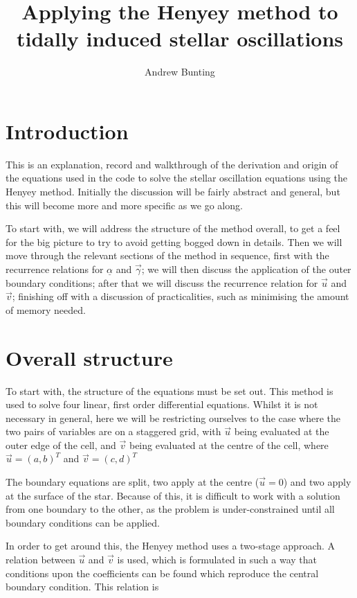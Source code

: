 \documentclass[11pt]{amsart}
\title{Applying the Henyey method to tidally induced stellar oscillations}
\author{Andrew Bunting}
\begin{document}
\maketitle

\section{Introduction}

This is an explanation, record and walkthrough of the derivation and origin of the equations used in the code to solve the stellar oscillation equations using the Henyey method.  Initially the discussion will be fairly abstract and general, but this will become more and more specific as we go along.

To start with, we will address the structure of the method overall, to get a feel for the big picture to try to avoid getting bogged down in details.  Then we will move through the relevant sections of the method in sequence, first with the recurrence relations for $\underline{\alpha}$ and $\vec{\gamma}$; we will then discuss the application of the outer boundary conditions; after that we will discuss the recurrence relation for $\vec{u}$ and $\vec{v}$; finishing off with a discussion of practicalities, such as minimising the amount of memory needed.


\section{Overall structure}

To start with, the structure of the equations must be set out.  This method is used to solve four linear, first order differential equations.  Whilst it is not necessary in general, here we will be restricting ourselves to the case where the two pairs of variables are on a staggered grid, with $\vec{u}$ being evaluated at the outer edge of the cell, and $\vec{v}$ being evaluated at the centre of the cell, where $\vec{u} = \left( a, b \right)^{T}$ and $\vec{v} = \left( c, d \right)^{T}$

The boundary equations are split, two apply at the centre ($\vec{u} = 0$) and two apply at the surface of the star.  Because of this, it is difficult to work with a solution from one boundary to the other, as the problem is under-constrained until all boundary conditions can be applied.

In order to get around this, the Henyey method uses a two-stage approach.  A relation between $\vec{u}$ and $\vec{v}$ is used, which is formulated in such a way that conditions upon the coefficients can be found which reproduce the central boundary condition.  This relation is
\end{document}

